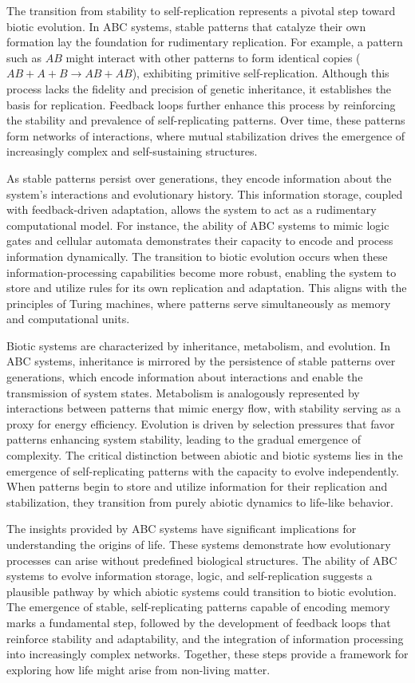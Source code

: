 \documentclass[entropy,article,submit,pdftex,moreauthors]{Definitions/mdpi}
\begin{document}
The transition from stability to self-replication represents a pivotal step toward biotic evolution. In ABC systems, stable patterns that catalyze their own formation lay the foundation for rudimentary replication. For example, a pattern such as \( AB \) might interact with other patterns to form identical copies (\( AB + A + B \to AB + AB \)), exhibiting primitive self-replication. Although this process lacks the fidelity and precision of genetic inheritance, it establishes the basis for replication. Feedback loops further enhance this process by reinforcing the stability and prevalence of self-replicating patterns. Over time, these patterns form networks of interactions, where mutual stabilization drives the emergence of increasingly complex and self-sustaining structures.

As stable patterns persist over generations, they encode information about the system's interactions and evolutionary history. This information storage, coupled with feedback-driven adaptation, allows the system to act as a rudimentary computational model. For instance, the ability of ABC systems to mimic logic gates and cellular automata demonstrates their capacity to encode and process information dynamically. The transition to biotic evolution occurs when these information-processing capabilities become more robust, enabling the system to store and utilize rules for its own replication and adaptation. This aligns with the principles of Turing machines, where patterns serve simultaneously as memory and computational units.

Biotic systems are characterized by inheritance, metabolism, and evolution. In ABC systems, inheritance is mirrored by the persistence of stable patterns over generations, which encode information about interactions and enable the transmission of system states. Metabolism is analogously represented by interactions between patterns that mimic energy flow, with stability serving as a proxy for energy efficiency. Evolution is driven by selection pressures that favor patterns enhancing system stability, leading to the gradual emergence of complexity. The critical distinction between abiotic and biotic systems lies in the emergence of self-replicating patterns with the capacity to evolve independently. When patterns begin to store and utilize information for their replication and stabilization, they transition from purely abiotic dynamics to life-like behavior.

The insights provided by ABC systems have significant implications for understanding the origins of life. These systems demonstrate how evolutionary processes can arise without predefined biological structures. The ability of ABC systems to evolve information storage, logic, and self-replication suggests a plausible pathway by which abiotic systems could transition to biotic evolution. The emergence of stable, self-replicating patterns capable of encoding memory marks a fundamental step, followed by the development of feedback loops that reinforce stability and adaptability, and the integration of information processing into increasingly complex networks. Together, these steps provide a framework for exploring how life might arise from non-living matter.
\end{document}

